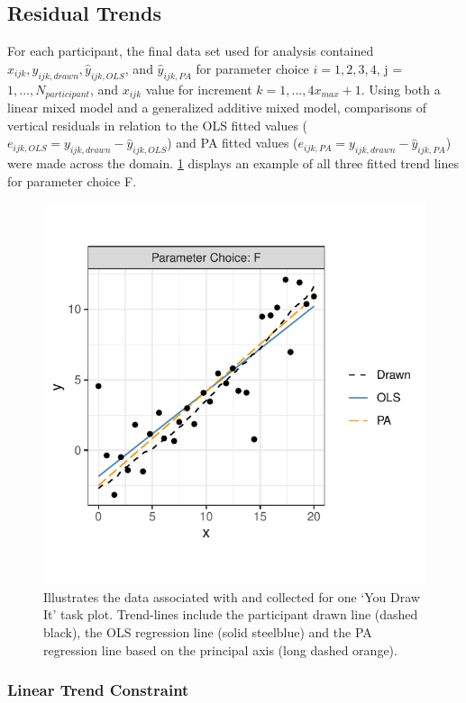\documentclass[12pt]{article}
\begin{document}
\hypertarget{residual-trends}{%
\subsection{Residual Trends}\label{residual-trends}}

For each participant, the final data set used for analysis contained
\(x_{ijk}, y_{ijk,drawn}, \hat y_{ijk,OLS}\), and \(\hat y_{ijk,PA}\)
for parameter choice \(i = 1,2,3,4\), j = \(1,...,N_{participant}\), and
\(x_{ijk}\) value for increment \(k = 1, ...,4 x_{max} + 1\). Using both
a linear mixed model and a generalized additive mixed model, comparisons
of vertical residuals in relation to the OLS fitted values
(\(e_{ijk,OLS} = y_{ijk,drawn} - \hat y_{ijk,OLS}\)) and PA fitted
values (\(e_{ijk,PA} = y_{ijk,drawn} - \hat y_{ijk,PA}\)) were made
across the domain. \cref{fig:eyefitting-example-plot} displays an
example of all three fitted trend lines for parameter choice F.

\begin{figure}[tbp]

{\centering \includegraphics[width=0.5\linewidth,]{Eye-Fitting-Straight-Lines-in-the-Modern-Era_files/figure-latex/eyefitting-example-plot-1} 

}

\caption{Illustrates the data associated with and collected for one `You Draw It' task plot. Trend-lines include the participant drawn line (dashed black), the OLS regression line (solid steelblue) and the PA regression line based on the principal axis (long dashed orange).}\label{fig:eyefitting-example-plot}
\end{figure}

\hypertarget{linear-trend-constraint}{%
\subsubsection{Linear Trend Constraint}\label{linear-trend-constraint}}
\end{document}
